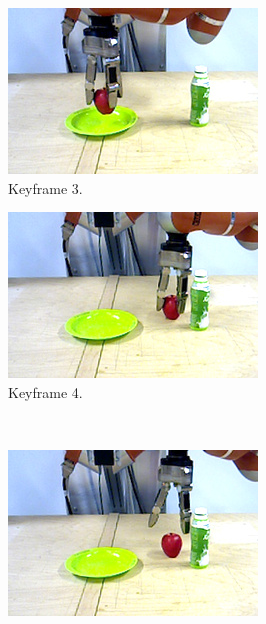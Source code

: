 \begin{figure}
\begin{subfigure}[t]{0.475\textwidth}
    \includegraphics[width=\textwidth]{./figures/sec/planning/exec3/frame0893.jpg}
    \caption{Keyframe 3.}
    \label{fig:sec_usingaffordanceforplanning_results_scenario3_3}
  \end{subfigure}
  \hfill
  \begin{subfigure}[t]{0.475\textwidth}
    \includegraphics[width=\textwidth]{./figures/sec/planning/exec3/frame1095.jpg}
    \caption{Keyframe 4.}
    \label{fig:sec_usingaffordanceforplanning_results_scenario3_4}
  \end{subfigure}\\%
  \begin{subfigure}[t]{0.475\textwidth}
    \includegraphics[width=\textwidth]{./figures/sec/planning/exec3/frame1174.jpg}

\end{subfigure}
\end{figure}
